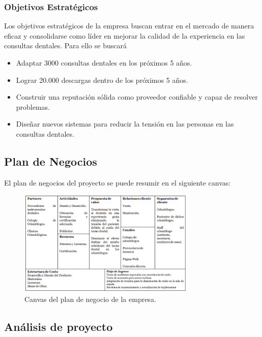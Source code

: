 \documentclass[letterpaper,12pt]{article}
\begin{document}
		\subsubsection{Objetivos Estratégicos}

Los objetivos estratégicos de la empresa buscan entrar en el mercado de manera eficaz y
consolidarse como líder en mejorar la calidad de la experiencia en las consultas dentales. Para ello 
se buscará

			\begin{itemize}
				\setlength{\itemsep}{0pt}%
				\setlength{\parskip}{0pt}%
				\item Adaptar 3000 consultas dentales en los próximos 5 años.
				\item Lograr 20.000 descargas dentro de los próximos 5 años.
				\item Construir una reputación sólida como proveedor confiable y capaz de resolver problemas.
				\item Diseñar nuevos sistemas para reducir la tensión en las personas en las consultas dentales.
			\end{itemize}
	\newpage
	\subsection{Plan de Negocios}

El plan de negocios del proyecto se puede resumir en el siguiente canvas:

		\begin{figure}[h!]
			\begin{center}
				\includegraphics[width=0.75\textwidth]{canvas}
				\caption{Canvas del plan de negocio de la empresa.}
				\label{canvas}
			\end{center}
		\end{figure}

	\subsection{Análisis de proyecto}
\end{document}
